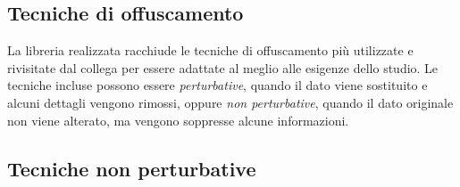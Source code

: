 \subsection{Tecniche di offuscamento}
La libreria realizzata racchiude le tecniche di offuscamento più utilizzate e rivisitate dal collega per essere adattate al meglio alle esigenze dello studio. Le tecniche incluse possono essere \emph{perturbative}, quando il dato viene sostituito e alcuni dettagli vengono rimossi, oppure  \emph{non perturbative}, quando il dato originale non viene alterato, ma vengono soppresse alcune informazioni.

\subsection*{Tecniche non perturbative}

